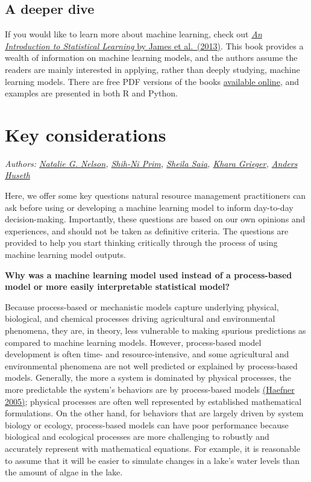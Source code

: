 \documentclass[
]{book}
\begin{document}
\hypertarget{a-deeper-dive}{%
\section{A deeper dive}\label{a-deeper-dive}}

If you would like to learn more about machine learning, check out \href{https://www.statlearning.com/}{\emph{An Introduction to Statistical Learning} by James et al.~(2013)}. This book provides a wealth of information on machine learning models, and the authors assume the readers are mainly interested in applying, rather than deeply studying, machine learning models. There are free PDF versions of the books \href{https://www.statlearning.com/}{available online}, and examples are presented in both R and Python.

\hypertarget{key-considerations}{%
\chapter{Key considerations}\label{key-considerations}}

\emph{Authors: \href{https://bae.ncsu.edu/people/nnelson4/}{Natalie G. Nelson}, \href{https://www.linkedin.com/in/shih-ni-prim-14033336/}{Shih-Ni Prim}, \href{https://sheilasaia.rbind.io/}{Sheila Saia}, \href{https://cals.ncsu.edu/applied-ecology/people/kdgriege/}{Khara Grieger}, \href{https://cals.ncsu.edu/entomology-and-plant-pathology/people/ashuseth/}{Anders Huseth}}

Here, we offer some key questions natural resource management practitioners can ask before using or developing a machine learning model to inform day-to-day decision-making. Importantly, these questions are based on our own opinions and experiences, and should not be taken as definitive criteria. The questions are provided to help you start thinking critically through the process of using machine learning model outputs.

\textbf{Why was a machine learning model used instead of a process-based model or more easily interpretable statistical model?}

Because process-based or mechanistic models capture underlying physical, biological, and chemical processes driving agricultural and environmental phenomena, they are, in theory, less vulnerable to making spurious predictions as compared to machine learning models. However, process-based model development is often time- and resource-intensive, and some agricultural and environmental phenomena are not well predicted or explained by process-based models. Generally, the more a system is dominated by physical processes, the more predictable the system's behaviors are by process-based models \href{https://link.springer.com/book/10.1007/b106568}{(Haefner 2005)}; physical processes are often well represented by established mathematical formulations. On the other hand, for behaviors that are largely driven by system biology or ecology, process-based models can have poor performance because biological and ecological processes are more challenging to robustly and accurately represent with mathematical equations. For example, it is reasonable to assume that it will be easier to simulate changes in a lake's water levels than the amount of algae in the lake.
\end{document}

